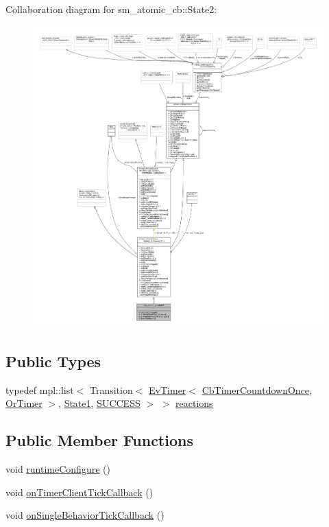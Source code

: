 Collaboration diagram for sm\+\_\+atomic\+\_\+cb\+:\+:State2\+:
\nopagebreak
\begin{figure}[H]
\begin{center}
\leavevmode
\includegraphics[width=350pt]{structsm__atomic__cb_1_1State2__coll__graph}
\end{center}
\end{figure}
\subsection*{Public Types}
\begin{DoxyCompactItemize}
\item 
typedef mpl\+::list$<$ Transition$<$ \hyperlink{structcl__ros__timer_1_1EvTimer}{Ev\+Timer}$<$ \hyperlink{classcl__ros__timer_1_1CbTimerCountdownOnce}{Cb\+Timer\+Countdown\+Once}, \hyperlink{classsm__atomic__cb_1_1OrTimer}{Or\+Timer} $>$, \hyperlink{structsm__atomic__cb_1_1State1}{State1}, \hyperlink{structsmacc_1_1default__transition__tags_1_1SUCCESS}{S\+U\+C\+C\+E\+SS} $>$ $>$ \hyperlink{structsm__atomic__cb_1_1State2_adfec734cfe3cac0b449fca9cc41a4ad2}{reactions}
\end{DoxyCompactItemize}
\subsection*{Public Member Functions}
\begin{DoxyCompactItemize}
\item 
void \hyperlink{structsm__atomic__cb_1_1State2_a47560e2531cd7d9ae1ab2da6e7bc47d0}{runtime\+Configure} ()
\item 
void \hyperlink{structsm__atomic__cb_1_1State2_a9367ee51725a8f2e8cdbf7d922cf9108}{on\+Timer\+Client\+Tick\+Callback} ()
\item 
void \hyperlink{structsm__atomic__cb_1_1State2_a4187898b6f6e82dd8f12770856fb8e24}{on\+Single\+Behavior\+Tick\+Callback} ()
\end{DoxyCompactItemize}
